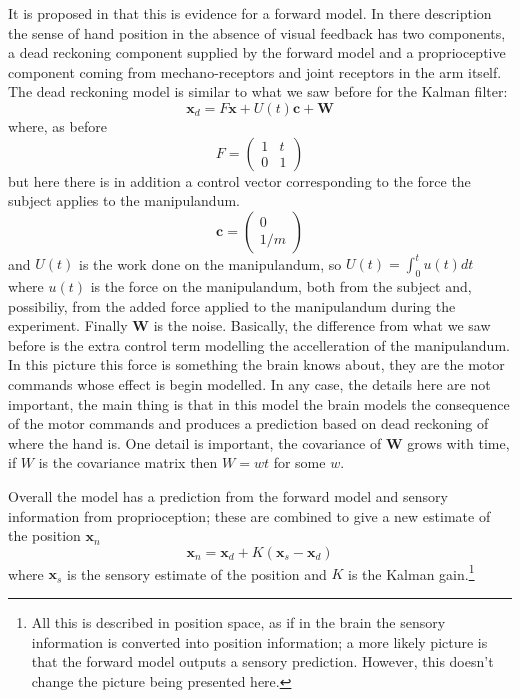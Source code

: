 \documentclass[12pt]{article}
\begin{document}
It is proposed in \cite{WolpertEtAl1995} that this is evidence for a
forward model. In there description the sense of hand position in the
absence of visual feedback has two components, a dead reckoning
component supplied by the forward model and a proprioceptive component
coming from mechano-receptors and joint receptors in the arm
itself. The dead reckoning model is similar to what we saw before for
the Kalman filter:
\begin{equation}
\mathbf{x}_d=F\textbf{x}+U(t)\textbf{c}+\textbf{W}
\end{equation}
where, as before 
\begin{equation}
F=\left(\begin{array}{cc}1&t\\0&1\end{array}\right)
\end{equation}
but here there is in addition a control vector corresponding to the
force the subject applies to the manipulandum. 
\begin{equation}
\textbf{c}=\left(\begin{array}{c} 0\\1/m\end{array}\right)
\end{equation}
and $U(t)$ is the work done on the manipulandum, so $U(t)=\int_0^t
u(t)dt$ where $u(t)$ is the force on the manipulandum, both from the
subject and, possibiliy, from the added force applied to the
manipulandum during the experiment. Finally $\textbf{W}$ is the
noise. Basically, the difference from what we saw before is the extra
control term modelling the accelleration of the manipulandum. In this
picture this force is something the brain knows about, they are the
motor commands whose effect is begin modelled. In any case, the
details here are not important, the main thing is that in this model
the brain models the consequence of the motor commands and produces a
prediction based on dead reckoning of where the hand is. One detail is
important, the covariance of $\mathbf{W}$ grows with time, if $W$ is
the covariance matrix then $W=wt$ for some $w$.

Overall the model has a prediction from the forward model and sensory
information from proprioception; these are combined to give a new
estimate of the position $\mathbf{x}_n$
\begin{equation}
\mathbf{x}_n=\textbf{x}_d+K(\textbf{x}_s-\textbf{x}_d)
\end{equation}
where $\mathbf{x}_s$ is the sensory estimate of the position and $K$
is the Kalman gain.\footnote{All this is described in position space,
  as if in the brain the sensory information is converted into
  position information; a more likely picture is that the forward
  model outputs a sensory prediction. However, this doesn't change the
  picture being presented here.}
\end{document}
